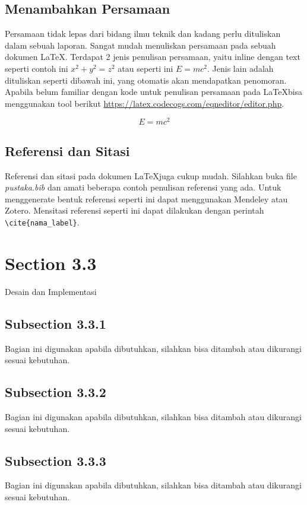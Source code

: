 \subsection{Menambahkan Persamaan}
Persamaan tidak lepas dari bidang ilmu teknik dan kadang perlu dituliskan dalam sebuah laporan. Sangat mudah menuliskan persamaan pada sebuah dokumen \LaTeX. Terdapat 2 jenis penulisan persamaan, yaitu inline dengan text seperti contoh ini \(x^2 + y^2 = z^2\) atau seperti ini $E=mc^2$. Jenis lain adalah dituliskan seperti dibawah ini, yang otomatis akan mendapatkan penomoran. Apabila belum familiar dengan kode untuk penulisan persamaan pada \LaTeX bisa menggunakan tool berikut \url{https://latex.codecogs.com/eqneditor/editor.php}.

\begin{equation}
    E=mc^2
\end{equation}

\subsection{Referensi dan Sitasi}
Referensi dan sitasi pada dokumen \LaTeX juga cukup mudah. Silahkan buka file \textit{pustaka.bib} dan amati beberapa contoh penulisan referensi yang ada. Untuk menggenerate bentuk referensi seperti ini dapat menggunakan Mendeley atau Zotero. Mensitasi referensi seperti ini \cite{kongkanand2006} dapat dilakukan dengan perintah \verb|\cite{nama_label}|.

\section{Section 3.3}
Desain dan Implementasi

\subsection{Subsection 3.3.1}
Bagian ini digunakan apabila dibutuhkan, silahkan bisa ditambah atau dikurangi sesuai kebutuhan.

\subsection{Subsection 3.3.2}
Bagian ini digunakan apabila dibutuhkan, silahkan bisa ditambah atau dikurangi sesuai kebutuhan.

\subsection{Subsection 3.3.3}
Bagian ini digunakan apabila dibutuhkan, silahkan bisa ditambah atau dikurangi sesuai kebutuhan.

